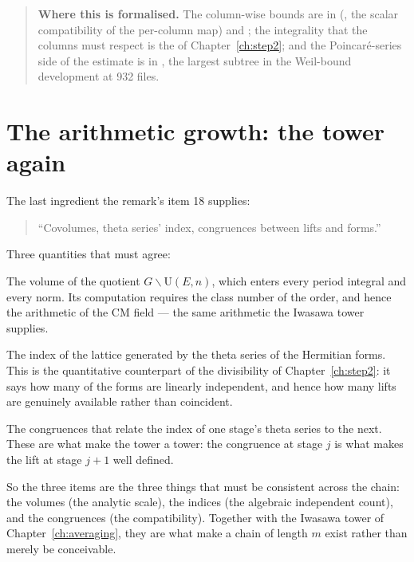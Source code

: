 \begin{quote}
\textbf{Where this is formalised.} The column-wise bounds are in
(, the scalar compatibility of the per-column map) and
;
the integrality that the columns must respect is the  of
Chapter~\ref{ch:step2}; and the Poincar\'e-series side of the estimate is in
, the largest
subtree in the Weil-bound development at 932 files.
\end{quote}

\section{The arithmetic growth: the tower again}The last ingredient the remark's item 18 supplies:

\begin{quote}
\small
``Covolumes, theta series' index, congruences between lifts and forms.''
\end{quote}

Three quantities that must agree:

\begin{description}[style=nextline,leftmargin=0pt,labelwidth=0pt,labelsep=0pt,font=\sffamily\bfseries\small,
  itemsep=6pt]
\item[\textbf{Covolumes}] The volume of the quotient
$G\backslash \mathrm{U}(E,n)$, which enters every period integral and every
norm. Its computation requires the class number of the order, and hence the
arithmetic of the CM field --- the same arithmetic the Iwasawa tower
supplies.
\item[\textbf{The index of the theta series}] The index of the lattice
generated by the theta series of the Hermitian forms. This is the
quantitative counterpart of the divisibility of Chapter~\ref{ch:step2}: it
says how many of the forms are linearly independent, and hence how many
lifts are genuinely available rather than coincident.
\item[\textbf{Congruences between lifts and forms}] The congruences that
relate the index of one stage's theta series to the next. These are what make
the tower a tower: the congruence at stage $j$ is what makes the lift at
stage $j+1$ well defined.
\end{description}

So the three items are the three things that must be consistent across the
chain: the volumes (the analytic scale), the indices (the algebraic
independent count), and the congruences (the compatibility). Together with
the Iwasawa tower of Chapter~\ref{ch:averaging}, they are what make a chain of
length $m$ exist rather than merely be conceivable.

